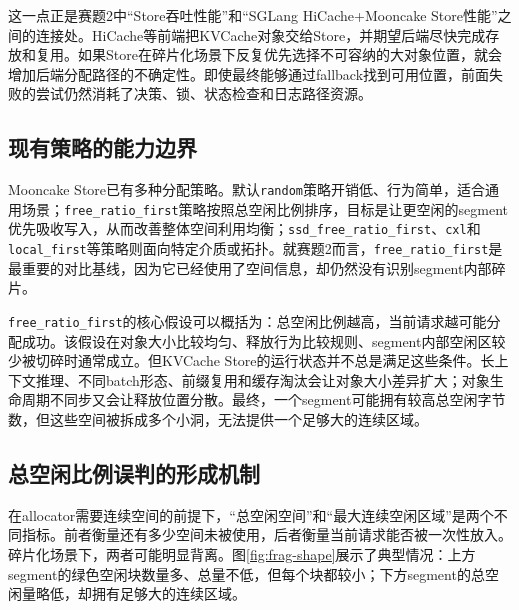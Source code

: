 \documentclass[UTF8,zihao=-4,a4paper]{ctexart}
\newcommand{\artifact}[1]{\texttt{#1}}
\newcommand{\baseline}{\texttt{free\_ratio\_first}}
\begin{document}
这一点正是赛题2中“Store吞吐性能”和“SGLang HiCache+Mooncake Store性能”之间的连接处。HiCache等前端把KVCache对象交给Store，并期望后端尽快完成存放和复用。如果Store在碎片化场景下反复优先选择不可容纳的大对象位置，就会增加后端分配路径的不确定性。即使最终能够通过fallback找到可用位置，前面失败的尝试仍然消耗了决策、锁、状态检查和日志路径资源。

\subsection{现有策略的能力边界}

Mooncake Store已有多种分配策略。默认\artifact{random}策略开销低、行为简单，适合通用场景；\baseline{}策略按照总空闲比例排序，目标是让更空闲的segment优先吸收写入，从而改善整体空间利用均衡；\artifact{ssd\_free\_ratio\_first}、\artifact{cxl}和\artifact{local\_first}等策略则面向特定介质或拓扑。就赛题2而言，\baseline{}是最重要的对比基线，因为它已经使用了空间信息，却仍然没有识别segment内部碎片。

\baseline{}的核心假设可以概括为：总空闲比例越高，当前请求越可能分配成功。该假设在对象大小比较均匀、释放行为比较规则、segment内部空闲区较少被切碎时通常成立。但KVCache Store的运行状态并不总是满足这些条件。长上下文推理、不同batch形态、前缀复用和缓存淘汰会让对象大小差异扩大；对象生命周期不同步又会让释放位置分散。最终，一个segment可能拥有较高总空闲字节数，但这些空间被拆成多个小洞，无法提供一个足够大的连续区域。

\subsection{总空闲比例误判的形成机制}

在allocator需要连续空间的前提下，“总空闲空间”和“最大连续空闲区域”是两个不同指标。前者衡量还有多少空间未被使用，后者衡量当前请求能否被一次性放入。碎片化场景下，两者可能明显背离。图\ref{fig:frag-shape}展示了典型情况：上方segment的绿色空闲块数量多、总量不低，但每个块都较小；下方segment的总空闲量略低，却拥有足够大的连续区域。
\end{document}
